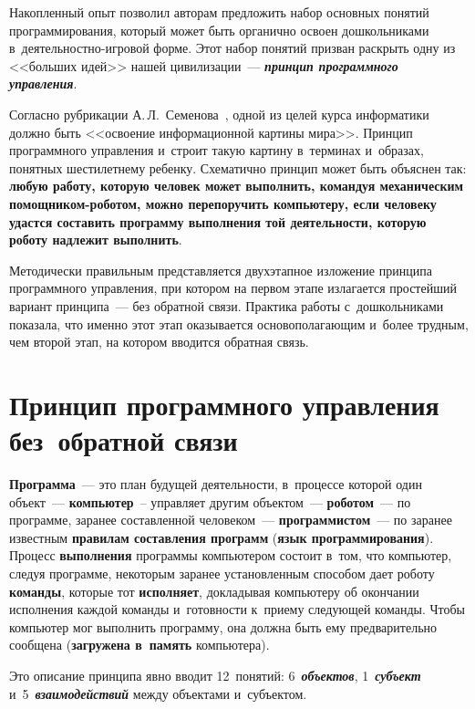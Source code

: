 \begin{multicols}{2}
  Накопленный опыт позволил авторам предложить набор основных понятий 
программирования, который может быть органично освоен дошкольниками 
в~дея\-тель\-ност\-но-иг\-ро\-вой форме. Этот набор понятий призван раскрыть 
одну из <<больших идей>> нашей цивилизации~--- {\bfseries\textit{принцип 
программного управ\-ления}}. 
  
  Согласно рубрикации А.\,Л.~Семенова~\cite[п.~12]{6-bet}, одной из целей 
курса информатики должно быть <<освоение информационной картины 
мира>>. Принцип программного управления и~строит такую картину 
в~терминах и~образах, понятных шестилетнему ребенку. Схематично принцип 
может быть объяснен так: \textbf{любую работу, которую человек может 
выполнить, командуя механическим по\-мощ\-ни\-ком-ро\-бо\-том, можно 
перепоручить компьютеру, если человеку удастся составить программу 
выполнения той деятельности, которую роботу надлежит выполнить}. 
  
  Методически правильным представляется двухэтапное изложение принципа 
программного управ\-ле\-ния, при котором на первом этапе излагается 
простейший вариант принципа~--- без обратной связи. Практика работы 
с~дошкольниками показала, что именно этот этап оказывается 
ос\-но\-во\-по\-ла\-гаю\-щим и~более трудным, чем второй этап, на котором вводится 
обратная связь.
  
\section{Принцип программного управления без~обратной связи}

  \textbf{Программа}~--- это план будущей деятельности,\linebreak
   в~процессе которой 
один объект~--- \textbf{компьютер}~-- управляет другим объектом~--- 
\textbf{роботом}~--- по программе, заранее составленной человеком~--- 
\textbf{программистом}~--- по заранее известным \textbf{правилам\linebreak 
составления программ} (\textbf{язык программирования}). Процесс 
\textbf{выполнения} программы компьютером состоит в~том, что компьютер, 
следуя программе, некоторым заранее установленным способом дает роботу 
\textbf{команды}, которые тот \textbf{исполняет}, докладывая компьютеру об 
окончании исполнения каждой команды и~готовности к~приему следующей 
команды. Чтобы компьютер мог выполнить программу, она должна быть ему 
предварительно сообщена (\textbf{загружена в~память} компьютера).
  
  Это описание принципа явно вводит 12~понятий: 
6~{\bfseries\textit{объектов}}, 1~{\bfseries\textit{субъект}} 
и~5~{\bfseries\textit{взаимодействий}} между объектами и~субъектом.
   

\end{multicols}
